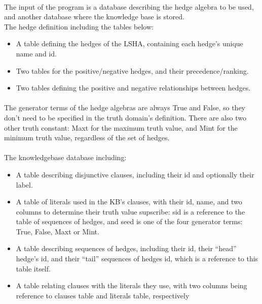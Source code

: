 \documentclass[../gr-final.tex]{subfiles}
\begin{document}
\paragraph{}The input of the program is a database describing the hedge algebra to be used, and another database where the knowledge base is stored.\\
The hedge definition including the tables below:
\begin{itemize}
\item A table defining the hedges of the LSHA, containing each hedge's
  unique name and id.
\item Two tables for the positive/negative hedges, and their precedence/ranking.
\item Two tables defining the positive and negative relationships 
  between hedges.
\end{itemize}

\paragraph{}The generator terms of the hedge algebras are always True
and False, so they don't need to be specified in the truth domain's
definition. There are also two other truth constant: Maxt for the
maximum truth value, and Mint for the minimum truth value, regardless
of the set of hedges.\\ 

\paragraph{}The knowledgebase database including:

\begin{itemize}
\item A table describing disjunctive clauses, including their id and
  optionally their label. 
\item A table of literals used in the KB's clauses, with their id,
  name, and two columns to determine their truth value supscribe: sid
  is a reference to the table of sequences of hedges, and seed is one
  of the four generator terms: True, False, Maxt or Mint.
\item A table describing sequences of hedges, including their id,
  their ``head'' hedge's id, and their ``tail'' sequences of hedges
  id, which is a reference to this table itself. 
\item A table relating clauses with the literals they use, with two
  columns being reference to clauses table and literals table, respectively
\end{itemize}
\end{document}
